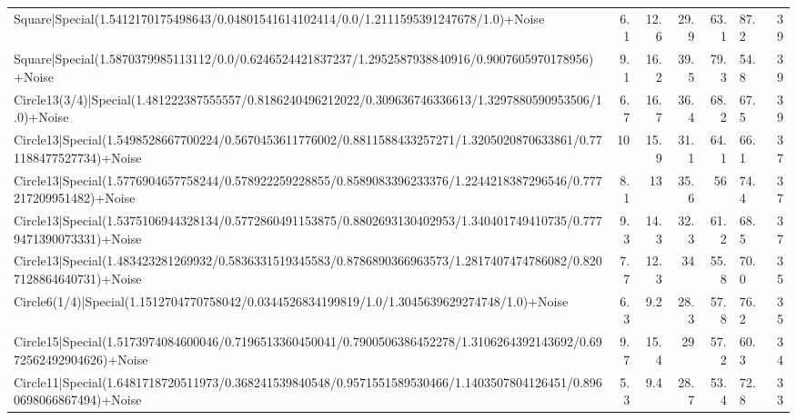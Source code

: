 \begin{tabular}{lrrrrlr}
 Square|Special(1.5412170175498643/0.04801541614102414/0.0/1.2111595391247678/1.0)+Noise                                       &             6.1 &           12.6 &            29.9 &            63.1 & 87.2            &           39 \\
 Square|Special(1.5870379985113112/0.0/0.6246524421837237/1.2952587938840916/0.9007605970178956)+Noise                         &             9.1 &           16.2 &            39.5 &            79.3 & 54.8            &           39 \\
 Circle13(3/4)|Special(1.481222387555557/0.8186240496212022/0.309636746336613/1.3297880590953506/1.0)+Noise                    &             6.7 &           16.7 &            36.4 &            68.2 & 67.5            &           39 \\
 Circle13|Special(1.5498528667700224/0.5670453611776002/0.8811588433257271/1.3205020870633861/0.771188477527734)+Noise         &            10   &           15.9 &            31.1 &            64.1 & 66.1            &           37 \\
 Circle13|Special(1.5776904657758244/0.578922259228855/0.8589083396233376/1.2244218387296546/0.777217209951482)+Noise          &             8.1 &           13   &            35.6 &            56   & 74.4            &           37 \\
 Circle13|Special(1.5375106944328134/0.5772860491153875/0.8802693130402953/1.340401749410735/0.7779471390073331)+Noise         &             9.3 &           14.3 &            32.3 &            61.2 & 68.5            &           37 \\
 Circle13|Special(1.483423281269932/0.5836331519345583/0.8786890366963573/1.2817407474786082/0.8207128864640731)+Noise         &             7.7 &           12.3 &            34   &            55.8 & 70.0            &           35 \\
 Circle6(1/4)|Special(1.1512704770758042/0.0344526834199819/1.0/1.3045639629274748/1.0)+Noise                                  &             6.3 &            9.2 &            28.3 &            57.8 & 76.2            &           35 \\
 Circle15|Special(1.5173974084600046/0.7196513360450041/0.7900506386452278/1.3106264392143692/0.6972562492904626)+Noise        &             9.7 &           15.4 &            29   &            57.2 & 60.3            &           34 \\
 Circle11|Special(1.6481718720511973/0.368241539840548/0.9571551589530466/1.1403507804126451/0.8960698066867494)+Noise         &             5.3 &            9.4 &            28.7 &            53.4 & 72.8            &           33 \\

\end{tabular}
